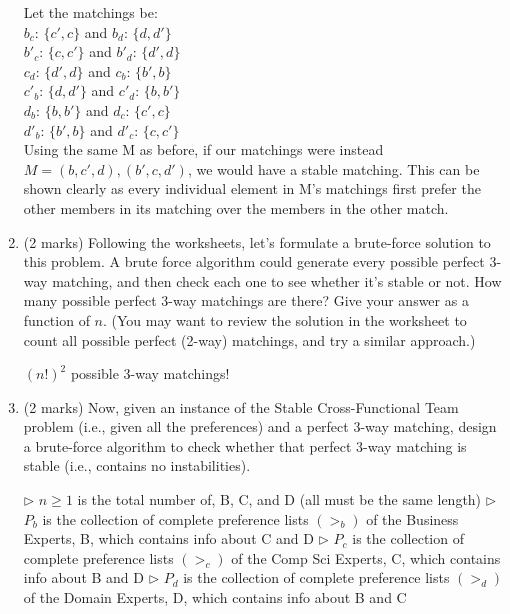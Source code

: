 \documentclass[11pt]{article}
\begin{document}
\begin{enumerate}
\begin{soln}
    Let the matchings be: \\
    $b_c$: $\{c', c\}$ and $b_d$: $\{d, d'\}$ \\
    $b'_c$: $\{c, c'\}$ and $b'_d$: $\{d', d\}$ \\
    $c_d$: $\{d', d\}$ and $c_b$: $\{b', b\}$ \\
    $c'_{b}$: $\{d, d'\}$ and $c'_{d}$: $\{b, b'\}$ \\
    $d_{b}$: $\{b, b'\}$ and $d_{c}$: $\{c', c\}$ \\
    $d'_{b}$: $\{b', b\}$ and $d'_{c}$: $\{c, c'\}$ \\
    Using the same M as before, if our matchings were instead $M = {(b, c', d), (b', c, d')}$, we would have a stable matching. This can be shown clearly as every individual element in M's matchings first prefer the other members in its matching over the members in the other match.
\end{soln}

\item (2 marks)
Following the worksheets, let's formulate a brute-force
solution to this problem.  A brute force algorithm could generate
every possible perfect 3-way matching, and then check each one
to see whether it's stable or not.
How many possible perfect 3-way matchings are there?  Give your
answer as a function of $n$.  (You may want to review the solution
in the worksheet to count all possible perfect (2-way) matchings,
and try a similar approach.)

\begin{soln}
    $(n!)^2$ possible 3-way matchings!
\end{soln}

\item (2 marks)
Now, given an instance of the Stable Cross-Functional Team problem
(i.e., given all the preferences) and a perfect 3-way matching, design
a brute-force algorithm to check whether that perfect 3-way matching
is stable (i.e., contains no instabilities).
\begin{soln}
    \begin{algorithmic}[1]
    \State $\triangleright$ $n \geq 1$ is the total number of, B, C, and D (all must be the same length)
    \State $\triangleright$ $P_b$ is the collection of complete preference lists $(> _b)$ of the Business Experts, B, which contains info about C and D
    \State $\triangleright$ $P_c$ is the collection of complete preference lists $(> _c)$ of the Comp Sci Experts, C, which contains info about B and D
    \State $\triangleright$ $P_d$ is the collection of complete preference lists $(> _d)$ of the Domain Experts, D, which contains info about B and C
    

\end{algorithmic}
\end{soln}
\end{enumerate}
\end{document}
